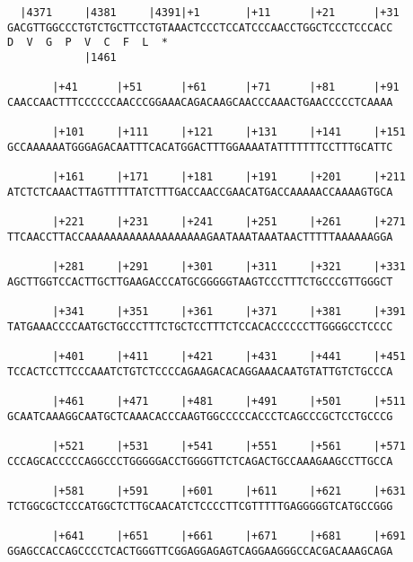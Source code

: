 \documentclass{article}
\begin{document}
\begin{Verbatim}
  |4371     |4381     |4391|+1       |+11      |+21      |+31
GACGTTGGCCCTGTCTGCTTCCTGTAAACTCCCTCCATCCCAACCTGGCTCCCTCCCACC
D  V  G  P  V  C  F  L  *   
            |1461                                           
  
       |+41      |+51      |+61      |+71      |+81      |+91
CAACCAACTTTCCCCCCAACCCGGAAACAGACAAGCAACCCAAACTGAACCCCCTCAAAA
                                                            
       |+101     |+111     |+121     |+131     |+141     |+151
GCCAAAAAATGGGAGACAATTTCACATGGACTTTGGAAAATATTTTTTTCCTTTGCATTC
                                                            
       |+161     |+171     |+181     |+191     |+201     |+211
ATCTCTCAAACTTAGTTTTTATCTTTGACCAACCGAACATGACCAAAAACCAAAAGTGCA
                                                            
       |+221     |+231     |+241     |+251     |+261     |+271
TTCAACCTTACCAAAAAAAAAAAAAAAAAAAGAATAAATAAATAACTTTTTAAAAAAGGA
                                                            
       |+281     |+291     |+301     |+311     |+321     |+331
AGCTTGGTCCACTTGCTTGAAGACCCATGCGGGGGTAAGTCCCTTTCTGCCCGTTGGGCT
                                                            
       |+341     |+351     |+361     |+371     |+381     |+391
TATGAAACCCCAATGCTGCCCTTTCTGCTCCTTTCTCCACACCCCCCTTGGGGCCTCCCC
                                                            
       |+401     |+411     |+421     |+431     |+441     |+451
TCCACTCCTTCCCAAATCTGTCTCCCCAGAAGACACAGGAAACAATGTATTGTCTGCCCA
                                                            
       |+461     |+471     |+481     |+491     |+501     |+511
GCAATCAAAGGCAATGCTCAAACACCCAAGTGGCCCCCACCCTCAGCCCGCTCCTGCCCG
                                                            
       |+521     |+531     |+541     |+551     |+561     |+571
CCCAGCACCCCCAGGCCCTGGGGGACCTGGGGTTCTCAGACTGCCAAAGAAGCCTTGCCA
                                                            
       |+581     |+591     |+601     |+611     |+621     |+631
TCTGGCGCTCCCATGGCTCTTGCAACATCTCCCCTTCGTTTTTGAGGGGGTCATGCCGGG
                                                            
       |+641     |+651     |+661     |+671     |+681     |+691
GGAGCCACCAGCCCCTCACTGGGTTCGGAGGAGAGTCAGGAAGGGCCACGACAAAGCAGA
                                                            

\end{Verbatim}
\end{document}
